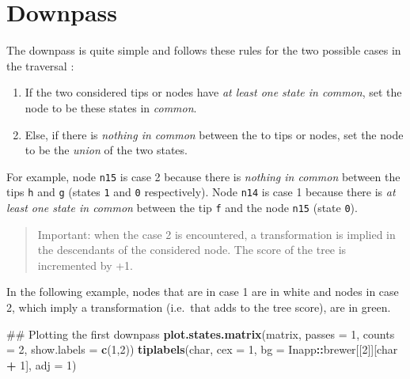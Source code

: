 \documentclass[]{book}
\newenvironment{Shaded}{\begin{snugshade}}{\end{snugshade}}
\newcommand{\KeywordTok}[1]{\textcolor[rgb]{0.13,0.29,0.53}{\textbf{#1}}}
\newcommand{\DataTypeTok}[1]{\textcolor[rgb]{0.13,0.29,0.53}{#1}}
\newcommand{\DecValTok}[1]{\textcolor[rgb]{0.00,0.00,0.81}{#1}}
\newcommand{\StringTok}[1]{\textcolor[rgb]{0.31,0.60,0.02}{#1}}
\newcommand{\OperatorTok}[1]{\textcolor[rgb]{0.81,0.36,0.00}{\textbf{#1}}}
\newcommand{\NormalTok}[1]{#1}
\providecommand{\tightlist}{%
  \setlength{\itemsep}{0pt}\setlength{\parskip}{0pt}}
\theoremstyle{definition}
\theoremstyle{definition}
\theoremstyle{definition}
\theoremstyle{remark}
\begin{document}
\hypertarget{downpass}{%
\section{Downpass}\label{downpass}}

The downpass is quite simple and follows these rules for the two
possible cases in the traversal \citep{Fitch1971}:

\begin{enumerate}
\def\labelenumi{\arabic{enumi}.}
\tightlist
\item
  If the two considered tips or nodes have \emph{at least one state in
  common}, set the node to be these states in \emph{common}.
\item
  Else, if there is \emph{nothing in common} between the to tips or
  nodes, set the node to be the \emph{union} of the two states.
\end{enumerate}

For example, node \texttt{n15} is case 2 because there is \emph{nothing
in common} between the tips \texttt{h} and \texttt{g} (states \texttt{1}
and \texttt{0} respectively). Node \texttt{n14} is case 1 because there
is \emph{at least one state in common} between the tip \texttt{f} and
the node \texttt{n15} (state \texttt{0}).

\begin{quote}
Important: when the case 2 is encountered, a transformation is implied
in the descendants of the considered node. The score of the tree is
incremented by +1.
\end{quote}

In the following example, nodes that are in case 1 are in white and
nodes in case 2, which imply a transformation (i.e.~that adds to the
tree score), are in green.

\begin{Shaded}
\begin{Highlighting}[]
\NormalTok{## Plotting the first downpass}
\KeywordTok{plot.states.matrix}\NormalTok{(matrix, }\DataTypeTok{passes =} \DecValTok{1}\NormalTok{, }\DataTypeTok{counts =} \DecValTok{2}\NormalTok{, }\DataTypeTok{show.labels =} \KeywordTok{c}\NormalTok{(}\DecValTok{1}\NormalTok{,}\DecValTok{2}\NormalTok{))}
\KeywordTok{tiplabels}\NormalTok{(char, }\DataTypeTok{cex =} \DecValTok{1}\NormalTok{, }\DataTypeTok{bg =}\NormalTok{ Inapp}\OperatorTok{::}\NormalTok{brewer[[}\DecValTok{2}\NormalTok{]][char }\OperatorTok{+}\StringTok{ }\DecValTok{1}\NormalTok{], }\DataTypeTok{adj =} \DecValTok{1}\NormalTok{)}
\end{Highlighting}
\end{Shaded}
\end{document}
